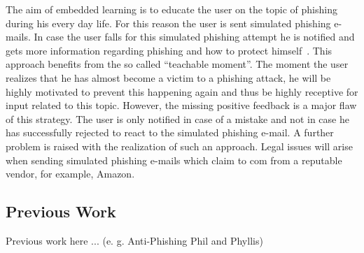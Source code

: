 \begin{description}[leftmargin=0cm]
	\item[Emdedded Learning] The aim of embedded learning is to educate the user on the topic of phishing during his every day life.
 For this reason the user is sent simulated phishing e-mails.
 In case the user falls for this simulated phishing attempt he is notified and gets more information regarding phishing and how to protect himself~\cite{embedded2011jansson, kumaraguru2009phishguru}. This approach benefits from the so called ``teachable moment''. The moment the user realizes that he has almost become a victim to a phishing attack, he will be highly motivated to prevent this happening again and thus be highly receptive for input related to this topic.
 However, the missing positive feedback is a major flaw of this strategy.
 The user is only notified in case of a mistake and not in case he has successfully rejected to react to the simulated phishing e-mail.
 A further problem is raised with the realization of such an approach.
 Legal issues will arise when sending simulated phishing e-mails which claim to com from a reputable vendor, for example, Amazon.

\end{description}

\subsection{Previous Work}
\label{s:prev_work}
Previous work here ... (e.
g.
 Anti-Phishing Phil and Phyllis)

